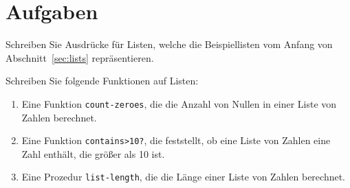 \section*{Aufgaben}

\begin{aufgabe}
  Schreiben Sie Ausdrücke für Listen, welche die Beispiellisten vom
  Anfang von Abschnitt~\ref{sec:lists} repräsentieren.
\end{aufgabe}

\begin{aufgabe}
Schreiben Sie folgende Funktionen auf Listen:
  
  \begin{enumerate} 
    
  \item Eine Funktion \texttt{count-zeroes}, die die Anzahl von Nullen
    in einer Liste von Zahlen berechnet.
    
  \item Eine Funktion \texttt{contains>10?}, die feststellt, ob eine
    Liste von Zahlen eine Zahl enthält, die größer als 10 ist.
    
  \item Eine Prozedur \texttt{list-length}, die die Länge einer Liste
    von Zahlen berechnet.

  \end{enumerate}
  
\end{aufgabe}

